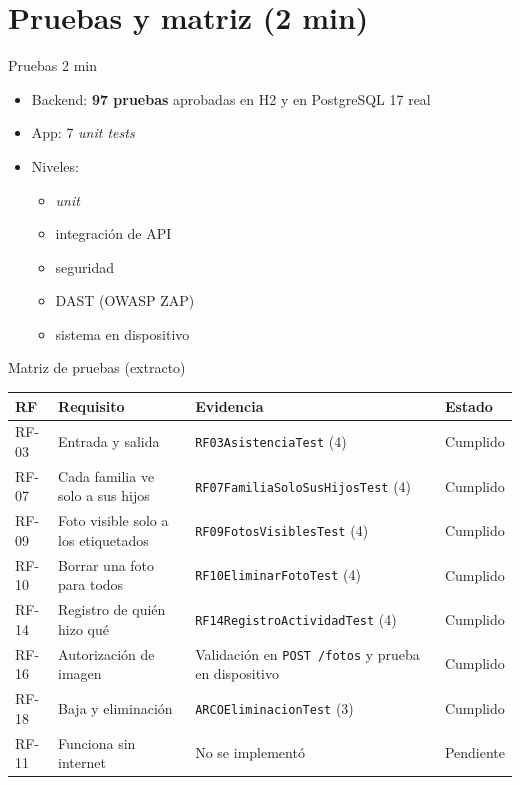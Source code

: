 \section{Pruebas y matriz (2 min)}

\begin{frame}{Pruebas \hfill\small 2 min}
  \large
  \begin{itemize}
    \item Backend: \textbf{97 pruebas} aprobadas en H2 y en PostgreSQL 17 real
    \item App: 7 \textit{unit tests}
    \item Niveles:
      \begin{itemize}
        \item \textit{unit}
        \item integración de API
        \item seguridad
        \item DAST (OWASP ZAP)
        \item sistema en dispositivo
      \end{itemize}
  \end{itemize}
\end{frame}

\begin{frame}{Matriz de pruebas (extracto)}
  \footnotesize
  \begin{tabular}{@{}l>{\raggedright\arraybackslash}p{4.6cm}>{\raggedright\arraybackslash}p{5.8cm}l@{}}
    \toprule
    \textbf{RF} & \textbf{Requisito} & \textbf{Evidencia} & \textbf{Estado}\\
    \midrule
    RF-03 & Entrada y salida & \texttt{RF03AsistenciaTest} (4) & Cumplido\\
    RF-07 & Cada familia ve solo a sus hijos & \texttt{RF07FamiliaSoloSusHijosTest} (4) & Cumplido\\
    RF-09 & Foto visible solo a los etiquetados & \texttt{RF09FotosVisiblesTest} (4) & Cumplido\\
    RF-10 & Borrar una foto para todos & \texttt{RF10EliminarFotoTest} (4) & Cumplido\\
    RF-14 & Registro de quién hizo qué & \texttt{RF14RegistroActividadTest} (4) & Cumplido\\
    RF-16 & Autorización de imagen & Validación en \texttt{POST /fotos} y prueba en dispositivo & Cumplido\\
    RF-18 & Baja y eliminación & \texttt{ARCOEliminacionTest} (3) & Cumplido\\
    RF-11 & Funciona sin internet & No se implementó & Pendiente\\
    \bottomrule
  \end{tabular}
\end{frame}
